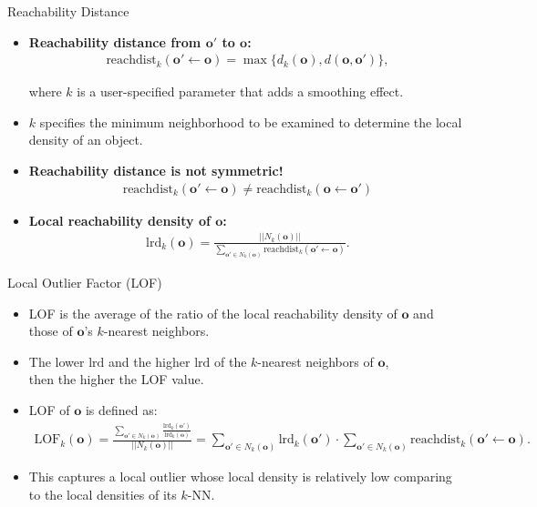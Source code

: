 \begin{frame}{Reachability Distance}
	\begin{itemize}
		\item \textbf{\color{airforceblue}Reachability distance from $\mathbf{o'}$ to $\mathbf{o}$:}
		      \begin{align*}
			      \text{reachdist}_k(\mathbf{o}' \leftarrow \mathbf{o}) = \max \{d_k(\mathbf{o}), d(\mathbf{o},\mathbf{o}')\},
		      \end{align*}

		      where $k$ is a user-specified parameter that adds a smoothing effect.
		\item $k$ specifies the minimum neighborhood to be examined to determine the local density of an object.
		\item \textbf{Reachability distance is not symmetric!}
		      \begin{align*}
			      \text{reachdist}_k(\mathbf{o}' \leftarrow \mathbf{o}) \neq \text{reachdist}_k(\mathbf{o} \leftarrow \mathbf{o}')
		      \end{align*}
		\item \textbf{Local reachability density of $\mathbf{o}$:}
		      \begin{align*}
			      \text{lrd}_k(\mathbf{o}) = \frac{||N_k(\mathbf{o})||}{\sum_{\mathbf{o'} \in N_k(\mathbf{o})} \text{reachdist}_k(\mathbf{o'} \leftarrow \mathbf{o})}.
		      \end{align*}
	\end{itemize}
\end{frame}


\begin{frame}{Local Outlier Factor (LOF)}
	\begin{itemize}
		\item LOF is the average of the ratio of the local reachability density of $\mathbf{o}$ and \\
		      those of $\mathbf{o}$'s $k$-nearest neighbors.
		\item The lower $\text{lrd}$ and the higher $\text{lrd}$ of the $k$-nearest neighbors of $\mathbf{o}$,\\
		      then the higher the LOF value.
		\item LOF of $\mathbf{o}$ is defined as:
		      \begin{align*}
			      \text{LOF}_k(\mathbf{o}) = \frac{\sum_{\mathbf{o'} \in N_k(\mathbf{o})} \frac{\text{lrd}_k(\mathbf{o'})}{\text{lrd}_k(\mathbf{o})}}{||N_k(\mathbf{o})||} =
			      \sum_{\mathbf{o'} \in N_k(\mathbf{o})} \text{lrd}_k(\mathbf{o'}) \cdot \sum_{\mathbf{o'} \in N_k(\mathbf{o})} \text{reachdist}_k(\mathbf{o'} \leftarrow \mathbf{o}).
		      \end{align*}
		\item This captures a local outlier whose local density is relatively low comparing to the local densities of its $k$-NN.

	\end{itemize}

\end{frame}
